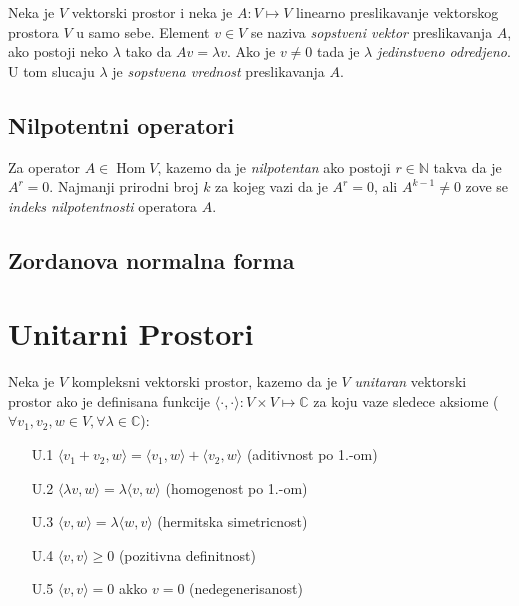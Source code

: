 \documentclass[12p,a4paper]{article}
\DeclareMathOperator{\Hom}{Hom}
\begin{document}
\begin{multicols}{2}
    Neka je $V$ vektorski prostor i neka je $A : V \mapsto V$ linearno 
    preslikavanje vektorskog prostora $V$ u samo sebe. Element $v \in V$ se 
    naziva \textit{sopstveni vektor} preslikavanja $A$, ako postoji neko 
    $\lambda$ tako da $Av = \lambda v$. Ako je $v \neq 0$ tada je $\lambda$ 
    \textit{jedinstveno odredjeno}. U tom slucaju $\lambda$ je 
    \textit{sopstvena vrednost} preslikavanja $A$.

\subsection{Nilpotentni operatori}

    Za operator $A \in \Hom V$, kazemo da je \textit{nilpotentan} ako postoji
    $r \in \mathbb{N}$ takva da je $A^r = 0$. Najmanji prirodni broj $k$ za 
    kojeg vazi da je $A^r = 0$, ali $A^{k-1} \neq 0$ zove se 
    \textit{indeks nilpotentnosti} operatora $A$.

\subsection{Zordanova normalna forma}


\section{Unitarni Prostori}

    Neka je $V$ kompleksni vektorski prostor, kazemo da je $V$ 
    \textit{unitaran} vektorski prostor ako je definisana funkcije 
    $\langle \cdot, \cdot \rangle : V \times V \mapsto \mathbb{C}$ 
    za koju vaze sledece aksiome 
    ($\forall v_1, v_2, w \in V, \forall \lambda \in \mathbb{C}$):
    \begin{enumerate}
        \itemsep0em
        \item [U.1] $\langle v_1 + v_2, w \rangle = 
            \langle v_1, w \rangle + \langle v_2, w \rangle$ 
            (aditivnost po 1.-om)
        \item [U.2] $\langle \lambda v, w \rangle = 
            \lambda \langle v, w \rangle$ (homogenost po 1.-om)
        \item [U.3] $\langle v, w \rangle = \lambda \langle w, v \rangle$ 
            (hermitska simetricnost)
        \item [U.4] $\langle v, v \rangle \geq 0$ (pozitivna definitnost)
        \item [U.5] $\langle v, v \rangle = 0$ akko $v = 0$ (nedegenerisanost)
    \end{enumerate}


\end{multicols}
\end{document}
